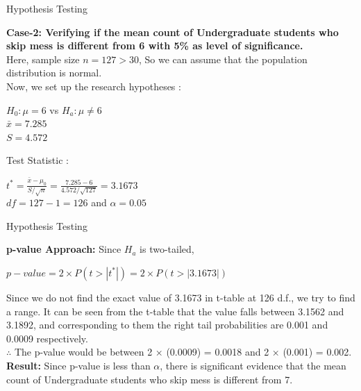 \documentclass{beamer}
\begin{document}
\begin{frame}{Hypothesis Testing}
\begin{block}{}
\textbf{Case-2: Verifying if the mean count of Undergraduate students who skip mess is different from 6 with 5\% as level of significance.}\\
Here, sample size $n = 127 > 30$, So we can assume that the population distribution is normal.\\
Now, we set up the research hypotheses :
\begin{center}
$H_0 : \mu = 6$ \quad vs \quad $H_a : \mu \neq 6$\\
$\bar{x} = 7.285$\\
$S = 4.572$
\end{center}
Test Statistic :
\begin{center}
$t^* = \frac{\bar{x}-\mu_0}{S/\sqrt{n}} = \frac{7.285-6}{4.572/\sqrt{127}} = 3.1673$\\
$df = 127 - 1 = 126$ and $\alpha = 0.05$
\end{center}
\end{block}
\end{frame}

\begin{frame}{Hypothesis Testing}
\begin{block}{}
\textbf{p-value Approach:}
Since $H_a$ is two-tailed,
\begin{center}
$p-value = 2\times P(t>|t^*|) = 2\times P(t>|3.1673|)$ 
\end{center}
Since we do not find the exact value of 3.1673 in t-table at 126 d.f., we try to find a range. It can be seen from the t-table that the value falls between 3.1562 and 3.1892, and corresponding to them the right tail probabilities are 0.001 and 0.0009 respectively.\\
$\therefore$ The p-value would be between 2 × (0.0009) = 0.0018 and 2 × (0.001) = 0.002.\\
\textbf{Result:}
Since p-value is less than $\alpha$, there is significant evidence that the mean count of Undergraduate students who skip mess is different from 7.
\end{block}
\end{frame}
\end{document}
